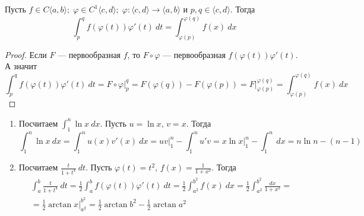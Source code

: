 \begin{theorem}
    Пусть $f \in C\langle a, b \rangle;\; \varphi \in C^{1}\langle c, d\rangle;\; \varphi\colon \langle c, d\rangle \to \langle a, b \rangle$ и $p, q \in \langle c, d \rangle$. Тогда
    \begin{equation*}
    \int_{p}^{q} f(\varphi(t))\varphi'(t) \: dt = \int_{\varphi(p)}^{\varphi(q)} f(x) \: dx
    \end{equation*}
\end{theorem}
\begin{proof}
    Если $F$ --- первообразная $f$, то $F \circ \varphi$ --- первообразная $f(\varphi(t))\varphi'(t)$. А значит
    \begin{equation*}
      \int_{p}^{q} f(\varphi(t))\varphi'(t) \: dt =
      F \circ \varphi \big|_{p}^{q} =
      F(\varphi(q)) - F(\varphi(p)) =
      F \big|_{\varphi(p)}^{\varphi(q)} =
      \int_{\varphi(p)}^{\varphi(q)} f(x) \: dx
    \end{equation*}
\end{proof}

\begin{examples}
  \begin{enumerate}
    \item
      Посчитаем $\displaystyle \int_{1}^{n} \ln x \: dx$. Пусть $u = \ln x,\, v = x$. Тогда
      \begin{equation*}
        \int_{1}^{n} \ln x \: dx = \int_{1}^{n} u(x)v'(x) \: dx = uv \big|_{1}^{n} - \int_{1}^{n} u'v = x\ln x \big|_{1}^{n} - \int_{1}^{n} \: dx = n \ln n - (n - 1)
      \end{equation*}
    \item
      Посчитаем $\displaystyle \frac{t}{1 + t^4} \: dt$. Пусть $\varphi(t) = t^2,\, f(x) = \frac{1}{1 + x^2}$. Тогда
      \begin{equation*}
        \begin{gathered}
          \int_{a}^{b} \frac{t}{1 + t^4} \: dt =
          \frac{1}{2}\int_{a}^{b} f(\varphi(t))\varphi'(t) \: dt =
          \frac{1}{2} \int_{a^2}^{b^2} f(x) \: dx =
          \frac{1}{2} \int_{a^2}^{b^2} \frac{dx}{1 + x^2}
          = \\ =
          \frac{1}{2} \arctan x \big|_{a^2}^{b^2} =
          \frac{1}{2} \arctan b^2 - \frac{1}{2} \arctan a^2
        \end{gathered}
      \end{equation*}
  \end{enumerate}
\end{examples}

